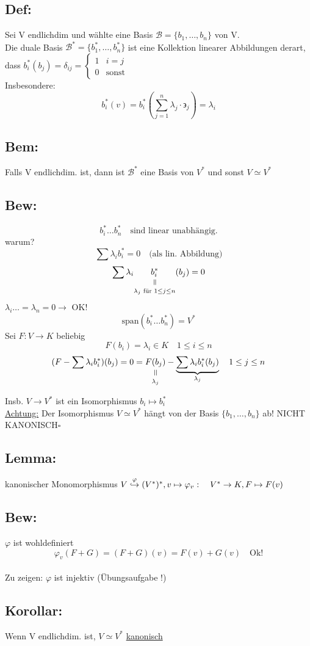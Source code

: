 \documentclass[titlepage,12pt,a4paper,ngerman]{report}
\newenvironment{bew}[1]{\subsection{Bew: #1}}{\hfill$\square$}
\newcommand{\Bew}[2]{\begin{bew}{#1}#2\end{bew}}
\newcommand{\verteq}{\rotatebox{90}{$\,=$}}
\newcommand{\equalto}[2]{\underset{\scriptstyle\overset{\mkern4mu\verteq}{#2}}{#1}}
\newcommand{\tx}[1]{\textrm{#1}}
\newcommand{\casess}[4]{\left\{ \begin{array}{ll} {#1} & {#2} \\ {#3} & {#4} \end{array} \right.}
\begin{document}
\subsection{Def:} Sei V endlichdim und wählte eine Basis $ \mathcal{B} = \{ b_1,\dots,b_n\} $ von  V.\\
Die duale Basis $ \mathcal{B}^* = \{b_1^*,\dots,b_n^*\} $ ist eine Kollektion linearer Abbildungen derart, dass $ b^*_i (b_j) = \delta_{ij} = \casess{1}{i=j}{0}{\tx{sonst}} $\\
Insbesondere:
$$b^*_i(v) = b_i^* (\sum_{j=1}^{n} \lambda_j \cdot \backepsilon_j) = \lambda_i$$
\subsection*{Bem:} Falls V endlichdim. ist, dann ist $ \mathcal{B}^*  $ eine Basis von $ V^* $ und sonst $ V\simeq V^* $

\Bew{}{
	$$b_i^* \dots b_n^* \quad \tx{sind linear unabhängig.}$$
	warum? $$\sum \lambda_i b_i^* = 0 \quad \tx{(als lin. Abbildung)}$$
	$$\sum \lambda_i \equalto{b_i^*}{\lambda_j \tx{ für } 1 \leq j \leq n}  (b_j) =0$$ 
	$\lambda_i \dots = \lambda_n = 0 \rightarrow$ OK!
	$$\tx{span}(b_i^* \dots b_n^*) = V^*$$
	Sei $F: V \to K$ beliebig 
	$$F(b_i) = \lambda_i \in K \quad 1 \leq i \leq n$$
	$$(F- \sum \lambda_i b_i^*) ( b_j) = 0 = \equalto{F(b_j)}{\lambda_j} - \underbrace{\sum \lambda_i b_i^* (b_j)}_{\lambda_j} \quad 1 \leq j \leq n$$
	
	Insb. $ V\to V^* $ ist ein Isomorphismus $  b_i \mapsto b_i^* $\\
	\underline{Achtung:} Der Isomorphismus $ V\simeq V^* $ hängt von der Basis $ \{b_1,\dots,b_n\} $ ab! NICHT KANONISCH}
\subsection{Lemma:} 
kanonischer Monomorphismus $ V \buildrel \varphi \over \hookrightarrow (V^*)^* , v \mapsto \varphi_v:\quad V^* \to K , F \mapsto F(v)$ 
\subsection{Bew:} $ \varphi $ ist wohldefiniert 
$$ \varphi_v(F+G) = (F+G) (v) = F(v)+ G(v) \quad \tx{Ok!}$$\\
Zu zeigen: $ \varphi $ ist injektiv (Übungsaufgabe !)
\subsection{Korollar:} Wenn V endlichdim. ist, $ V \simeq V^* $ \underline{kanonisch}
\end{document}
